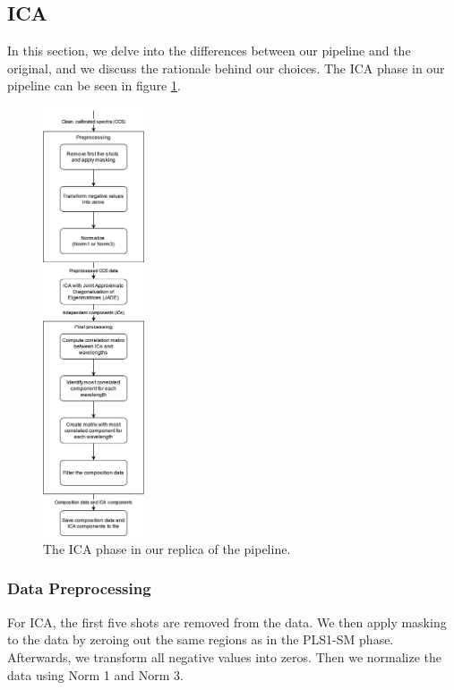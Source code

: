 \subsection{ICA}\label{sec:methodology_ica}
In this section, we delve into the differences between our pipeline and the original, and we discuss the rationale behind our choices.
The ICA phase in our pipeline can be seen in figure \ref{fig:ica_phase}.

\begin{figure}
	\centering
	\includegraphics[width=0.2675\textwidth]{images/ica_phase.png}
	\caption{The ICA phase in our replica of the pipeline.}
	\label{fig:ica_phase}
\end{figure}

\subsubsection{Data Preprocessing}\label{sec:ica_data_preprocessing}
For ICA, the first five shots are removed from the data.
We then apply masking to the data by zeroing out the same regions as in the PLS1-SM phase.
Afterwards, we transform all negative values into zeros.
Then we normalize the data using Norm 1 and Norm 3.

